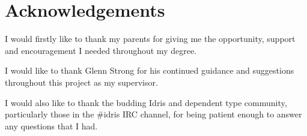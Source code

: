 \chapter*{Acknowledgements}
I would firstly like to thank my parents for giving me the opportunity, support
and encouragement I needed throughout my degree.

I would like to thank Glenn Strong for his continued guidance and suggestions
throughout this project as my supervisor.

I would also like to thank the budding Idris and dependent type community,
particularly those in the \#idris IRC channel, for being patient enough to
answer any questions that I had.
